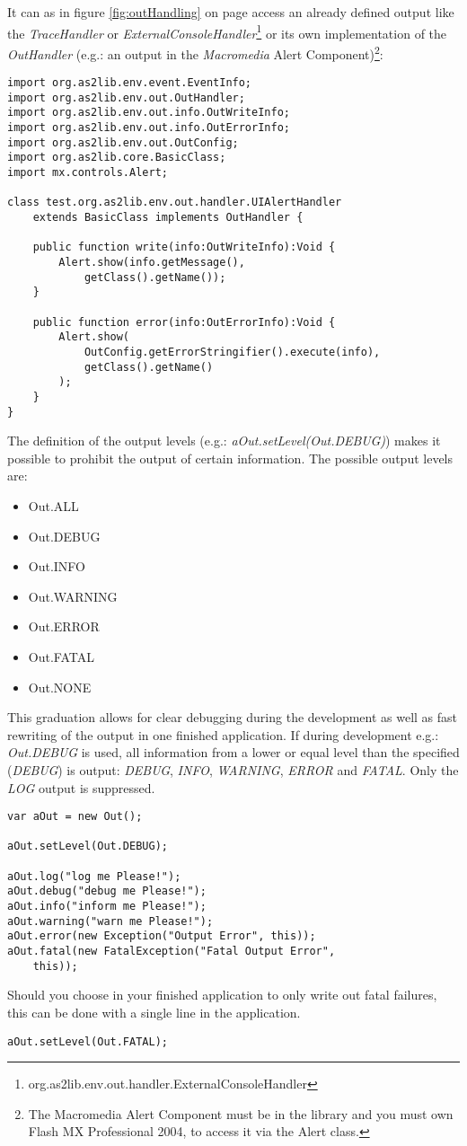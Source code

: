 It can as in figure \ref{fig:outHandling} on page \pageref{fig:outHandling} access an already defined output like the \emph{TraceHandler} or \emph{ExternalConsoleHandler}\footnote{org.as2lib.env.out.handler.ExternalConsoleHandler} or its own implementation of the \emph{OutHandler} (e.g.: an output in the {\sl Macromedia} Alert Component)\footnote{The Macromedia Alert Component must be in the library and you must own Flash MX Professional 2004, to access it via the Alert class.}:

\begin{lstlisting}[frame=single]
import org.as2lib.env.event.EventInfo;
import org.as2lib.env.out.OutHandler;
import org.as2lib.env.out.info.OutWriteInfo;
import org.as2lib.env.out.info.OutErrorInfo;
import org.as2lib.env.out.OutConfig;
import org.as2lib.core.BasicClass;
import mx.controls.Alert;

class test.org.as2lib.env.out.handler.UIAlertHandler 
	extends BasicClass implements OutHandler {

	public function write(info:OutWriteInfo):Void {
		Alert.show(info.getMessage(), 
			getClass().getName());
	}
	
	public function error(info:OutErrorInfo):Void {
		Alert.show(
			OutConfig.getErrorStringifier().execute(info),
			getClass().getName()
		);
	}
}
\end{lstlisting}

The definition of the output levels (e.g.: \emph{aOut.setLevel(Out.DEBUG)}) makes it possible to prohibit the output of certain information.
The possible output levels are:
\begin{itemize}
	\item Out.ALL
	\item Out.DEBUG
	\item Out.INFO
	\item Out.WARNING
	\item Out.ERROR
	\item Out.FATAL
	\item Out.NONE
\end{itemize}

This graduation allows for clear debugging during the development as well as fast rewriting of the output in one finished application.
If during development e.g.: \emph{Out.DEBUG} is used, all information from a lower or equal level than the specified (\textit{DEBUG}) is output: \textit{DEBUG}, \textit{INFO}, \textit{WARNING}, \textit{ERROR} and \textit{FATAL}. Only the \textit{LOG} output is suppressed.
\begin{lstlisting}[frame=single]
var aOut = new Out();

aOut.setLevel(Out.DEBUG);

aOut.log("log me Please!");
aOut.debug("debug me Please!");
aOut.info("inform me Please!");
aOut.warning("warn me Please!");
aOut.error(new Exception("Output Error", this));
aOut.fatal(new FatalException("Fatal Output Error",
	this));
\end{lstlisting}

Should you choose in your finished application to only write out fatal failures, this can be done with a single line in the application.

\begin{lstlisting}[frame=single]
aOut.setLevel(Out.FATAL);
\end{lstlisting}
